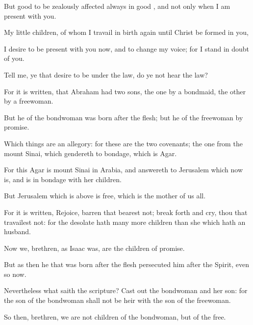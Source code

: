 {But
{}
good to be zealously
affected
always
in
{}
good
{},
and
not
only when
I am
present
with
you.

My little
children, of
whom I travail in
birth
again
until
Christ be
formed
in
you,

I
desire to be
present
with
you
now,
and to
change
my
voice;
for I stand in
doubt
of
you.


\par }{\PP {}Tell
me, ye
that
desire to
be
under the
law, do
ye
not
hear the
law?

For it is
written,
that
Abraham
had
two
sons, the
one
by a
bondmaid, the
other
by a
freewoman.

But
he
{}
of the
bondwoman was
born
after the
flesh;
but
he
of the
freewoman
{}
by
promise.

Which
things
are an
allegory:
for
these
are
the
two
covenants; the
one
from the
mount
Sinai, which
gendereth
to
bondage,
which
is
Agar.

For
this
Agar
is
mount
Sinai
in
Arabia,
and answereth
to
Jerusalem
which
now
is,
and is in
bondage
with
her
children.

But
Jerusalem which
is
above
is
free,
which
is the
mother of
us
all.

For it is
written,
Rejoice,
{}
barren
that
bearest
not; break
forth
and
cry, thou
that
travailest
not:
for the desolate
hath
many
more
children
than she
which
hath an
husband.

Now
we,
brethren,
as Isaac
was,
are the
children of
promise.

But
as
then he
that was
born
after the
flesh
persecuted
him
{}
after the
Spirit,
even
so
{}
now.

Nevertheless
what
saith the
scripture? Cast
out the
bondwoman
and
her
son:
for the
son of the
bondwoman
shall
not be
heir
with the
son of the
freewoman.

So
then,
brethren, we
are
not
children of the
bondwoman,
but of the
free.




\par }
